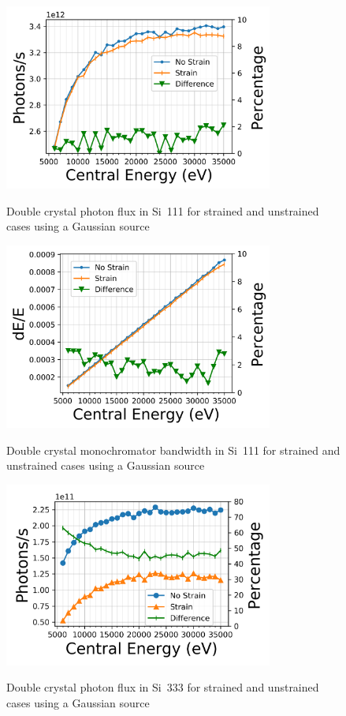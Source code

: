 \documentclass[preprint]{iucr}              %
\begin{document}
\begin{figure}
\caption{Double crystal photon flux in Si~111 for strained and unstrained cases using a Gaussian source}
\includegraphics[width = 8.85cm]{images/111flux.png}
\label{fig:111flux}
\end{figure}

\begin{figure}
\caption{Double crystal monochromator bandwidth in Si~111 for strained and unstrained cases using a Gaussian source}
\includegraphics[width = 8.85cm]{images/111monobw.png}
\label{fig:111monobw}
\end{figure}

\begin{figure}
\caption{Double crystal photon flux in Si~333 for strained and unstrained cases using a Gaussian source}
\includegraphics[width = 8.85cm]{images/333flux.png}
\label{fig:333flux}
\end{figure}
\end{document}
